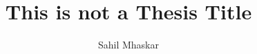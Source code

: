 
\newcommand*{\setsupervisor}[1]{\def\supervisorname{#1}}
\newcommand*{\setsupervisoremail}[1]{\def\supervisoremail{#1}}
\newcommand*{\thesistitle}[1]{\title{#1}}
\newcommand*{\examiner}[1]{\def\examname{#1}}
\newcommand*{\degree}[1]{\def\degreename{#1}}
\newcommand*{\authors}[1]{\author{#1}}
\newcommand*{\addresses}[1]{\def\addressnames{#1}}
\newcommand*{\university}[1]{\def\univname{#1}}
\newcommand*{\UNIVERSITY}[1]{\def\UNIVNAME{#1}}
\newcommand*{\department}[1]{\def\deptname{#1}}
\newcommand*{\DEPARTMENT}[1]{\def\DEPTNAME{#1}}
\newcommand*{\group}[1]{\def\groupname{#1}}
\newcommand*{\GROUP}[1]{\def\GROUPNAME{#1}}
\newcommand*{\faculty}[1]{\def\facname{#1}}
\newcommand*{\FACULTY}[1]{\def\FACNAME{#1}}
\newcommand*{\subject}[1]{\def\subjectname{#1}}
\newcommand*{\keywords}[1]{\def\keywordnames{#1}}
\newcommand*{\submissiondate}[1]{\def\sdate{#1}}
\newcommand*{\emailauthor}[1]{\def\@emailauthor{#1}}

\thesistitle{This is not a Thesis Title}  %

\setsupervisor{C. Aiswarya, M. Praveen}  %
\setsupervisoremail{aiswarya@cmi.ac.in, praveenm@cmi.ac.in}  %

\authors{Sahil Mhaskar}  %
\emailauthor{archit@cmi.ac.in}  %

\submissiondate{July 2025}  %

\addresses{}  %
\subject{}  %
\keywords{}  %

